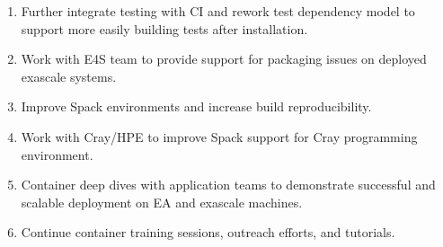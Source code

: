 \begin{enumerate}
\item Further integrate testing with CI and rework test dependency model to
      support more easily building tests after installation.

\item Work with E4S team to provide support for packaging issues on deployed
      exascale systems.

\item Improve Spack environments and increase build reproducibility.

\item Work with Cray/HPE to improve Spack support for Cray programming environment.

\item Container deep dives with application teams to demonstrate successful
      and scalable deployment on EA and exascale machines.

\item Continue container training sessions, outreach efforts, and tutorials.
\end{enumerate}
